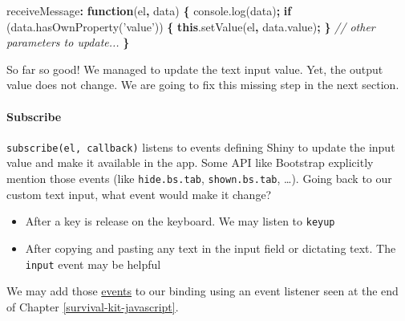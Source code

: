 \documentclass[]{book}
\newenvironment{Shaded}{\begin{snugshade}}{\end{snugshade}}
\newcommand{\AttributeTok}[1]{\textcolor[rgb]{0.77,0.63,0.00}{#1}}
\newcommand{\CommentTok}[1]{\textcolor[rgb]{0.56,0.35,0.01}{\textit{#1}}}
\newcommand{\ControlFlowTok}[1]{\textcolor[rgb]{0.13,0.29,0.53}{\textbf{#1}}}
\newcommand{\KeywordTok}[1]{\textcolor[rgb]{0.13,0.29,0.53}{\textbf{#1}}}
\newcommand{\NormalTok}[1]{#1}
\newcommand{\OperatorTok}[1]{\textcolor[rgb]{0.81,0.36,0.00}{\textbf{#1}}}
\newcommand{\StringTok}[1]{\textcolor[rgb]{0.31,0.60,0.02}{#1}}
\newcommand{\VariableTok}[1]{\textcolor[rgb]{0.00,0.00,0.00}{#1}}
\providecommand{\tightlist}{%
  \setlength{\itemsep}{0pt}\setlength{\parskip}{0pt}}
\let\oldparagraph\paragraph
\renewcommand{\paragraph}[1]{\oldparagraph{#1}\mbox{}}
\begin{document}
\begin{Shaded}
\begin{Highlighting}[]
\NormalTok{receiveMessage}\OperatorTok{:} \KeywordTok{function}\NormalTok{(el}\OperatorTok{,}\NormalTok{ data) }\OperatorTok{\{}
  \VariableTok{console}\NormalTok{.}\AttributeTok{log}\NormalTok{(data)}\OperatorTok{;}
  \ControlFlowTok{if}\NormalTok{ (}\VariableTok{data}\NormalTok{.}\AttributeTok{hasOwnProperty}\NormalTok{(}\StringTok{'value'}\NormalTok{)) }\OperatorTok{\{}
    \KeywordTok{this}\NormalTok{.}\AttributeTok{setValue}\NormalTok{(el}\OperatorTok{,} \VariableTok{data}\NormalTok{.}\AttributeTok{value}\NormalTok{)}\OperatorTok{;}
  \OperatorTok{\}}
  \CommentTok{// other parameters to update...}
\OperatorTok{\}}
\end{Highlighting}
\end{Shaded}

So far so good! We managed to update the text input value. Yet, the output value does not change. We are going to fix this missing step in the next section.

\hypertarget{subscribe}{%
\paragraph{Subscribe}\label{subscribe}}

\texttt{subscribe(el,\ callback)} listens to events defining Shiny to update the input value and make it available in the app. Some API like Bootstrap explicitly mention those events (like \texttt{hide.bs.tab}, \texttt{shown.bs.tab}, \ldots{}).
Going back to our custom text input, what event would make it change?

\begin{itemize}
\tightlist
\item
  After a key is release on the keyboard. We may listen to \texttt{keyup}
\item
  After copying and pasting any text in the input field or dictating text. The \texttt{input} event may be helpful
\end{itemize}

We may add those \href{https://javascript.info/events-change-input}{events} to our binding using an event listener seen at the end of Chapter \ref{survival-kit-javascript}.

\begin{Shaded}
\end{Shaded}
\end{document}
